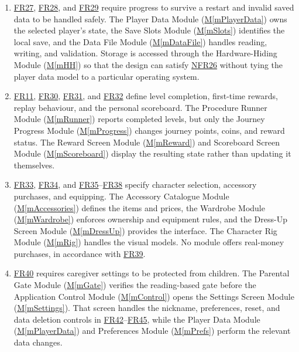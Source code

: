 \documentclass[10pt, titlepage]{article}
\newcommand{\srsurl}{https://team-hindsight.github.io/ophthamology-game/SRS/SRS.pdf}
\newcommand{\srsitemref}[2]{\href{\srsurl\#nameddest=#1}{#2}}
\newcommand{\mref}[1]{\texorpdfstring{\hyperref[md:#1]{M\ref*{#1}}}{M\ref*{#1}}}
\begin{document}
\begin{enumerate}[leftmargin=*, itemsep=0.5em, parsep=0.15em]
\item \srsitemref{FR_PersistState}{FR27}, \srsitemref{FR_RestoreState}{FR28},
  and \srsitemref{FR_CorruptData}{FR29} require progress to survive a restart
  and invalid saved data to be handled safely. The Player Data Module
  (\mref{mPlayerData}) owns the selected player's state, the Save Slots Module
  (\mref{mSlots}) identifies the local save, and the Data File Module
  (\mref{mDataFile}) handles reading, writing, and validation. Storage is
  accessed through the Hardware-Hiding Module (\mref{mHH}) so that the design
  can satisfy \srsitemref{NFR_DataProtection}{NFR26} without tying the player
  data model to a particular operating system.

\item \srsitemref{FR_LevelEnd}{FR11}, \srsitemref{FR_FirstReward}{FR30},
  \srsitemref{FR_NoDuplicateReward}{FR31}, and \srsitemref{FR_Scoreboard}{FR32}
  define level completion, first-time rewards, replay behaviour, and the
  personal scoreboard. The Procedure Runner Module (\mref{mRunner}) reports
  completed levels, but only the Journey Progress Module (\mref{mProgress})
  changes journey points, coins, and reward status. The Reward Screen Module
  (\mref{mReward}) and Scoreboard Screen Module (\mref{mScoreboard}) display
  the resulting state rather than updating it themselves.

\item \srsitemref{FR_ChooseCharacter}{FR33},
  \srsitemref{FR_DiverseCharacters}{FR34}, and
  \srsitemref{FR_Shop}{FR35}--\srsitemref{FR_Equip}{FR38} specify character
  selection, accessory purchases, and equipping. The Accessory Catalogue
  Module (\mref{mAccessories}) defines the items and prices, the Wardrobe
  Module (\mref{mWardrobe}) enforces ownership and equipment rules, and the
  Dress-Up Screen Module (\mref{mDressUp}) provides the interface. The
  Character Rig Module (\mref{mRig}) handles the visual models. No module
  offers real-money purchases, in accordance with
  \srsitemref{FR_NoRealMoney}{FR39}.

\item \srsitemref{FR_ParentGate}{FR40} requires caregiver settings to be
  protected from children. The Parental Gate Module (\mref{mGate}) verifies
  the reading-based gate before the Application Control Module
  (\mref{mControl}) opens the Settings Screen Module (\mref{mSettings}). That
  screen handles the nickname, preferences, reset, and data deletion controls
  in \srsitemref{FR_Nickname}{FR42}--\srsitemref{FR_ClearAllData}{FR45}, while
  the Player Data Module (\mref{mPlayerData}) and Preferences Module
  (\mref{mPrefs}) perform the relevant data changes.


\end{enumerate}
\end{document}
